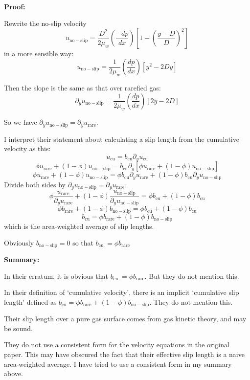 \documentclass{article}
\begin{document}
\textbf{Proof:}

Rewrite the no-slip velocity
\[ u_{\mathrm{no-slip}} = \frac{D^{2}}{2 \mu_{w}} \left( \frac{-dp}{dx} \right)
\left[ 1 - \left( \frac{y - D}{D}  \right)^{2} \right] \]
in a more sensible way:
\[ u_{\mathrm{no-slip}} = \frac{1}{2 \mu_{w}} \left( \frac{dp}{dx} \right)
\left[ y^{2} - 2 D y \right] \]

Then the slope is the same as that over rarefied gas:
\[ \partial_{y} u_{\mathrm{no-slip}} = \frac{1}{2 \mu_{w}} \left( \frac{dp}{dx} \right)
\left[ 2y - 2 D  \right] \]

So we have $\partial_{y} u_{\mathrm{no-slip}}=\partial_{y} u_{\mathrm{rare}}$.

I interpret their statement about calculating a slip length from the cumulative velocity as this:
\[ u_{\mathrm{cu}} = b_{\mathrm{cu}} \partial_y u_{\mathrm{cu}} \]
    \[ \phi u_{\mathrm{rare}} + (1-\phi) u_{\mathrm{no-slip}} = b_{\mathrm{cu}} \partial_y [ \phi u_{\mathrm{rare}} + (1-\phi) u_{\mathrm{no-slip}} ] \]
\[ \phi u_{\mathrm{rare}} + (1-\phi) u_{\mathrm{no-slip}} =  \phi b_{\mathrm{cu}}   \partial_y u_{\mathrm{rare}} + (1-\phi) b_{\mathrm{cu}} \partial_y u_{\mathrm{no-slip}} \]
Divide both sides by $\partial_{y} u_{\mathrm{no-slip}}=\partial_{y} u_{\mathrm{rare}}$.
\[ \phi \frac{u_{\mathrm{rare}}}{\partial_y u_{\mathrm{rare}}} + (1-\phi)\frac{ u_{\mathrm{no-slip}}}{\partial_y u_{\mathrm{no-slip}}} =  \phi b_{\mathrm{cu}}    + (1-\phi) b_{\mathrm{cu}}  \]
\[ \phi b_{\mathrm{rare}} + (1-\phi)b_{\mathrm{no-slip}} =
  \phi b_{\mathrm{cu}}    + (1-\phi) b_{\mathrm{cu}}  \]
\[b_{\mathrm{cu}} = \phi b_{\mathrm{rare}} + (1-\phi)b_{\mathrm{no-slip}} \]
which is the area-weighted average of slip lengths.

Obviously $ b_{\mathrm{no-slip}} = 0 $ so that $ b_{\mathrm{cu.}} = \phi b_{\mathrm{rare}} $

\textbf{Summary:}

In their erratum, it is obvious that $ b_{\mathrm{cu.}} = \phi b_{\mathrm{rare}} $. But they do not mention this.  

In their definition of `cumulative velocity', there is an implicit `cumulative slip length' defined as $ b_{\mathrm{cu}} = \phi b_{\mathrm{rare}} + (1-\phi)b_{\mathrm{no-slip}} $.  They do not mention this.

Their slip length over a pure gas surface comes from gas kinetic theory, and may be sound.

\vspace{1em}
They do not use a consistent form for the velocity equations in the original paper.  This may have obscured the fact that their effective slip length is a naive area-weighted average.  I have tried to use a consistent form in my summary above.
\end{document}
